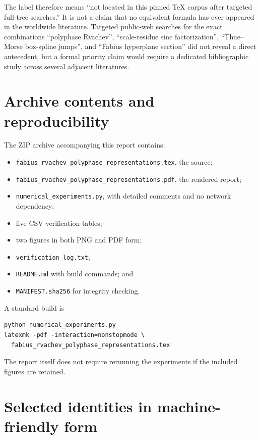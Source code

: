 \documentclass[11pt,oneside]{article}
\theoremstyle{definition}
\begin{document}
The label \statusnew therefore means ``not located in this pinned TeX corpus
after targeted full-tree searches.''  It is not a claim that no equivalent
formula has ever appeared in the worldwide literature.  Targeted public-web
searches for the exact combinations ``polyphase Rvachev'', ``scale-residue sinc
factorization'', ``Thue--Morse box-spline jumps'', and ``Fabius hyperplane
section'' did not reveal a direct antecedent, but a formal priority claim would
require a dedicated bibliographic study across several adjacent literatures.

\section{Archive contents and reproducibility}
\label{p2:app:archive}

The ZIP archive accompanying this report contains:
\begin{itemize}
\item \texttt{fabius\_rvachev\_polyphase\_representations.tex}, the source;
\item \texttt{fabius\_rvachev\_polyphase\_representations.pdf}, the rendered report;
\item \texttt{numerical\_experiments.py}, with detailed comments and no network dependency;
\item five CSV verification tables;
\item two figures in both PNG and PDF form;
\item \texttt{verification\_log.txt};
\item \texttt{README.md} with build commands; and
\item \texttt{MANIFEST.sha256} for integrity checking.
\end{itemize}

A standard build is
\begin{lstlisting}[style=python]
python numerical_experiments.py
latexmk -pdf -interaction=nonstopmode \
  fabius_rvachev_polyphase_representations.tex
\end{lstlisting}
The report itself does not require rerunning the experiments if the included
figures are retained.

\section{Selected identities in machine-friendly form}
\label{p2:app:machine-identities}
\end{document}
